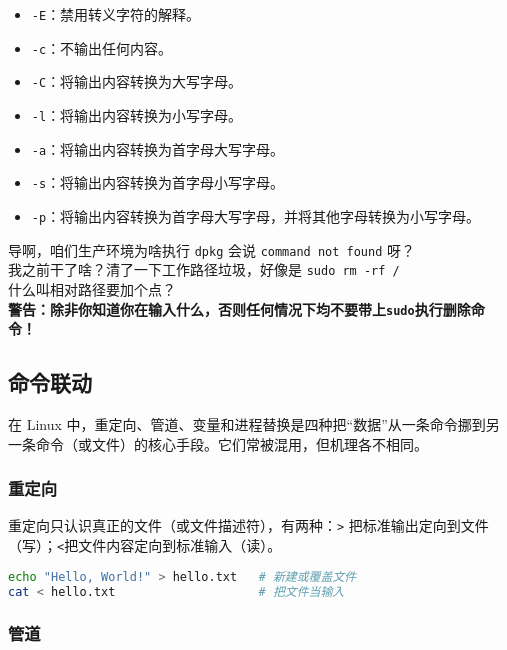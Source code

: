 \documentclass[../main.tex]{subfiles}
\begin{document}
\begin{itemize}
\begin{itemize}
\begin{itemize}
          \item \texttt{-E}：禁用转义字符的解释。
          \item \texttt{-c}：不输出任何内容。
          \item \texttt{-C}：将输出内容转换为大写字母。
          \item \texttt{-l}：将输出内容转换为小写字母。
          \item \texttt{-a}：将输出内容转换为首字母大写字母。
          \item \texttt{-s}：将输出内容转换为首字母小写字母。
          \item \texttt{-p}：将输出内容转换为首字母大写字母，并将其他字母转换为小写字母。
        \end{itemize}
    \end{itemize}
\end{itemize}

\begin{warning}
  导啊，咱们生产环境为啥执行 \texttt{dpkg} 会说 \texttt{command not found} 呀？\\
  我之前干了啥？清了一下工作路径垃圾，好像是 \texttt{sudo rm -rf /}\\
  什么叫相对路径要加个点？\\
  {\color{red}\textbf{警告：除非你知道你在输入什么，否则任何情况下均不要带上\texttt{sudo}执行删除命令！}}
\end{warning}

\subsection{命令联动}

在 Linux 中，重定向、管道、变量和进程替换是四种把“数据”从一条命令挪到另一条命令（或文件）的核心手段。它们常被混用，但机理各不相同。

\subsubsection{重定向}

重定向只认识真正的文件（或文件描述符），有两种：\texttt{>} 把标准输出定向到文件（写）；\texttt{<}把文件内容定向到标准输入（读）。
\begin{lstlisting}[language=bash]
echo "Hello, World!" > hello.txt   # 新建或覆盖文件
cat < hello.txt                    # 把文件当输入
\end{lstlisting}

\subsubsection{管道}
\end{document}
